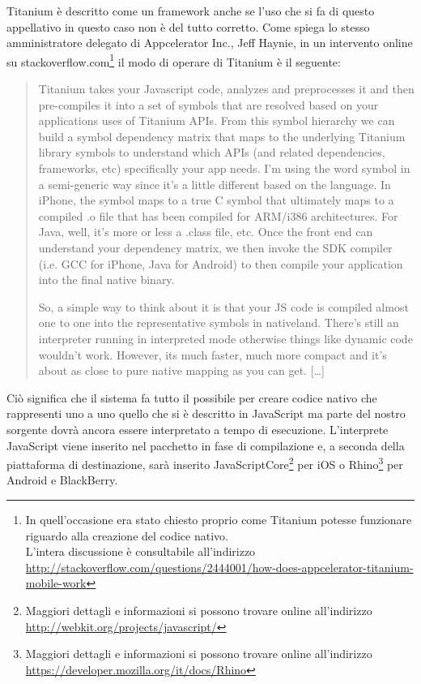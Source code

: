 			Titanium è descritto come un framework \crosscomp{}\citep{Web:peptechlearn.blogspot.it} anche se l'uso che si fa di 
			questo appellativo in questo caso non è del tutto corretto. Come 
			spiega lo stesso amministratore delegato di Appcelerator Inc., Jeff 
			Haynie, in un intervento online su 
			\mbox{stackoverflow.com}\footnote{In quell'occasione era stato 
			chiesto proprio come Titanium potesse funzionare riguardo alla 
			creazione del codice nativo.\\L'intera discussione è consultabile 
			all'indirizzo 
			\url{http://stackoverflow.com/questions/2444001/how-does-appcelerator-titanium-mobile-work}}
			il modo di operare di Titanium è il seguente:
			\begin{quotation}
				Titanium takes your Javascript code, analyzes and preprocesses 
				it and then pre-compiles it into a set of symbols that are 
				resolved based on your applications uses of Titanium APIs. From 
				this symbol hierarchy we can build a symbol dependency matrix 
				that maps to the underlying Titanium library symbols to 
				understand which APIs (and related dependencies, frameworks, 
				etc) specifically your app needs. I'm using the word symbol in a 
				semi-generic way since it's a little different based on the 
				language. In iPhone, the symbol maps to a true C symbol that 
				ultimately maps to a compiled .o file that has been compiled for 
				ARM/i386 architectures. For Java, well, it's more or less a 
				.class file, etc. Once the front end can understand your 
				dependency matrix, we then invoke the SDK compiler (i.e. GCC for 
				iPhone, Java for Android) to then compile your application into 
				the final native binary.
				
				So, a simple way to think about it is that your JS code is 
				compiled almost one to one into the representative symbols in 
				nativeland. There's still an interpreter running in interpreted 
				mode otherwise things like dynamic code wouldn't work. However, 
				its much faster, much more compact and it's about as close to 
				pure native mapping as you can get. [\ldots]
			\end{quotation}
			Ciò significa che il sistema fa tutto il possibile per creare codice 
			nativo che rappresenti uno a uno quello che si è descritto in 
			JavaScript ma parte del nostro sorgente dovrà ancora essere 
			interpretato a tempo di esecuzione. L'interprete JavaScript viene 
			inserito nel pacchetto in fase di compilazione e, a seconda della 
			piattaforma di destinazione, sarà inserito 
			JavaScriptCore\footnote{Maggiori dettagli e informazioni si possono 
			trovare online all'indirizzo\\ \url{http://webkit.org/projects/javascript/}} 
			per iOS o Rhino\footnote{Maggiori dettagli e informazioni si possono trovare 
			online all'indirizzo\\ \url{https://developer.mozilla.org/it/docs/Rhino}} 
			per Android e BlackBerry\citep{Web:KevinPost}.
			
